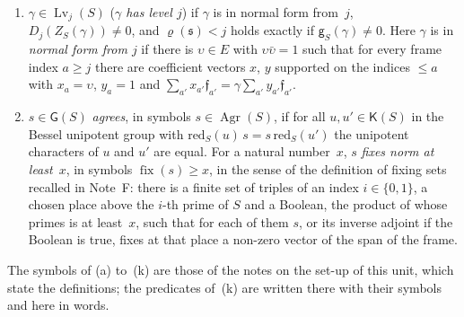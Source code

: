 \documentclass[11pt,a4paper]{article}
\newcommand{\Q}{\mathbb{Q}}
\newcommand{\m}[1]{\mbox{$#1$}}        %
\theoremstyle{plainx}
\theoremstyle{uprightx}
\newcommand{\fs}{\mathfrak{s}}                      %
\newcommand{\rh}[1]{\varrho(#1)}                    %
\newcommand{\ninf}[1]{f(#1)}                        %
\newcommand{\NS}[1]{N(#1)}                          %
\newcommand{\GRes}[1]{\mathsf{G}(#1)}               %
\newcommand{\KS}[1]{\mathsf{K}(#1)}                          %
\newcommand{\redS}[1]{\mathrm{red}_{#1}}            %
\newcommand{\Zf}[2]{Z_{#1}(#2)}                     %
\newcommand{\tdisc}[2]{\mathsf{g}_{#1}(#2)}         %
\newcommand{\tdnorm}[2]{\|\mathsf{g}\|_{#1}(#2)}    %
\newcommand{\mnorm}[3]{\mathrm{mn}_{#1}(#2;#3)}     %
\newcommand{\cgauge}[5]{\mathrm{cg}_{#1}(#2;#3,#4;#5)} %
\newcommand{\xri}[3]{\mathrm{i}_{#1,#2}(#3)}          %
\newcommand{\haslevel}[3]{#3\in\operatorname{Lv}_{#2}(#1)} %
\newcommand{\lminor}[2]{D_{#2}(#1)}                   %
\newcommand{\Agr}[2]{#2\in\operatorname{Agr}(#1)}     %
\newcommand{\FixN}[2]{\operatorname{fix}(#1)\ge #2}   %
\begin{document}
\begin{enumerate}[label=\textup{(\alph*)},leftmargin=2.3em,itemsep=2pt]
\emph{minor norm} and the \emph{gauge} are
\[\mnorm{S}{j}{\gamma}=|N_{E/\Q}(\lminor{\Zf{S}{\gamma}}{j})|\cdot\NS{S}^{-2(j-\rh{\fs})_+\ninf{E}},\]
\[\cgauge{S}{j}{c}{c'}{\gamma}=\frac{\max\bigl(\tdnorm{S}{\gamma},\ \NS{S}^{\ninf{E}}\mnorm{S}{j}{\gamma}\bigr)}
{\xri{S}{j}{k}\cdot\xri{S}{j}{k^{-1}}} .\]
\item \m{\haslevel{S}{j}{\gamma}} (\emph{$\gamma$ has level $j$}) if $\gamma$ is in normal form from~$j$,
\m{\lminor{\Zf{S}{\gamma}}{j}\ne0}, and \m{\rh{\fs}<j} holds exactly if \m{\tdisc{S}{\gamma}\ne0}. Here $\gamma$ is in
\emph{normal form from $j$} if there is \m{\upsilon\in E} with \m{\upsilon\bar\upsilon=1} such that for every frame
index \m{a\ge j} there are coefficient vectors $x$, $y$ supported on the indices \m{\le a} with \m{x_a=\upsilon},
\m{y_a=1} and \m{\sum_{a'}x_{a'}\mathfrak f_{a'}=\gamma\sum_{a'}y_{a'}\mathfrak f_{a'}}.
\item \m{s\in\GRes{S}} \emph{agrees}, in symbols \m{\Agr{S}{s}}, if for all \m{u,u'\in\KS{S}} in the Bessel
unipotent group with $\redS{S}(u)\,s=s\,\redS{S}(u')$ the unipotent characters of $u$ and $u'$ are equal. For a
natural number~$x$, $s$ \emph{fixes norm at least}~$x$, in symbols \m{\FixN{s}{x}}, in the sense of the
definition of fixing sets recalled in Note~F: there is a finite set of triples of an index \m{i\in\{0,1\}}, a
chosen place above the $i$-th prime of $S$ and a Boolean, the product of whose primes is at least~$x$, such
that for each of them $s$, or its inverse adjoint if the Boolean is true, fixes at that place a non-zero vector
of the span of the frame.
\end{enumerate}
The symbols of (a) to~(k) are those of the notes on the set-up of this unit, which state the definitions; the
predicates of~(k) are written there with their symbols and here in words.
\end{document}
